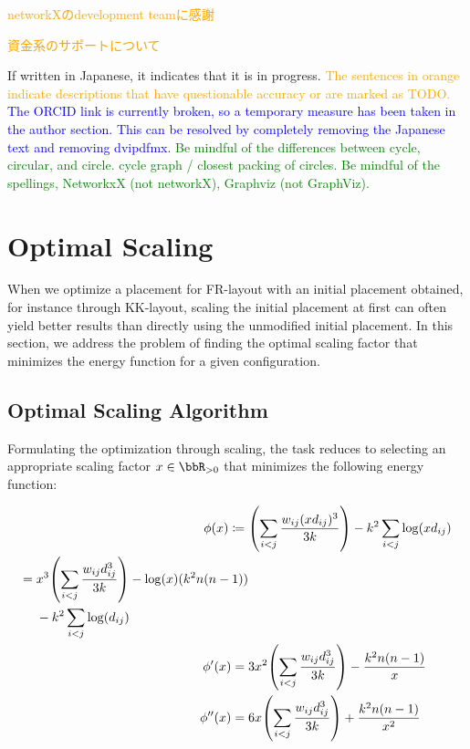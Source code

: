 \documentclass[dvipdfmx,lettersize,journal]{IEEEtran}
\newcommand{\blue}[1]{\textcolor{blue}{#1}}
\newcommand{\green}[1]{\textcolor{green}{#1}}
\newcommand{\orange}[1]{\textcolor{orange}{#1}}
\newcommand{\defeq}{\coloneqq}
\begin{document}
\orange{networkXのdevelopment teamに感謝}

\orange{資金系のサポートについて}


\appendices

If written in Japanese, it indicates that it is in progress.
\orange{The sentences in orange indicate descriptions that have questionable accuracy or are marked as TODO.}
\blue{The ORCID link is currently broken, so a temporary measure has been taken in the author section. This can be resolved by completely removing the Japanese text and removing dvipdfmx.}
\green{Be mindful of the differences between cycle, circular, and circle. cycle graph / closest packing of circles.}
\green{Be mindful of the spellings, NetworkxX (not networkX), Graphviz (not GraphViz).}

\section{Optimal Scaling}\label{sec:scaling}

When we optimize a placement for FR-layout with an initial placement obtained, for instance through KK-layout, scaling the initial placement at first can often yield better results than directly using the unmodified initial placement.
In this section, we address the problem of finding the optimal scaling factor that minimizes the energy function for a given configuration.

\subsection{Optimal Scaling Algorithm}\label{ssec:scalingAlgorithm}

Formulating the optimization through scaling, the task reduces to selecting an appropriate scaling factor $x \in \bbR_{> 0}$ that minimizes the following energy function:

\begin{align*}
  \phi(x) \defeq {} & \qty(\sum_{i < j} \frac{w_{ij} (xd_{ij})^3}{3k}) - k^2 \sum_{i < j} \log(x d_{ij})                                     \\
  \begin{split}
    = {} & x^3 \qty(\sum_{i < j} \frac{w_{ij} d_{ij}^3}{3k}) - \log(x)(k^2 n(n-1)) \\
         & - k^2 \sum_{i < j} \log(d_{ij})
  \end{split} \\
  \phi'(x) = {}     & 3x^2 \qty(\sum_{i < j} \frac{w_{ij} d_{ij}^3}{3k}) - \frac{k^2 n(n-1)}{x}                                              \\
  \phi''(x) = {}    & 6x \qty(\sum_{i < j} \frac{w_{ij} d_{ij}^3}{3k}) + \frac{k^2 n(n-1)}{x^2}
\end{align*}
\end{document}
